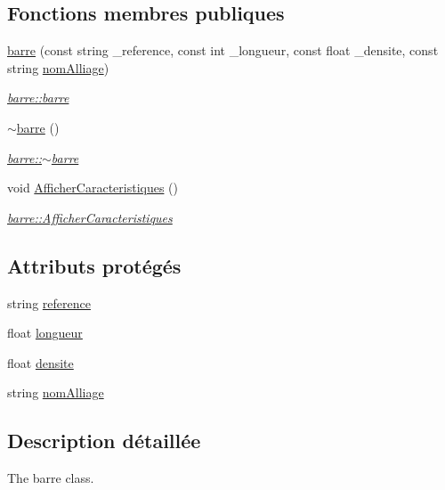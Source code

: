 \subsection*{Fonctions membres publiques}
\begin{DoxyCompactItemize}
\item 
\hyperlink{classbarre_a110cf86db5f686f1fc2dc3472c1d27a5}{barre} (const string \+\_\+reference, const int \+\_\+longueur, const float \+\_\+densite, const string \hyperlink{classbarre_ace8c42f734a0b6046dc7c6ef0e1226f5}{nom\+Alliage})
\begin{DoxyCompactList}\small\item\em \hyperlink{classbarre_a110cf86db5f686f1fc2dc3472c1d27a5}{barre\+::barre} \end{DoxyCompactList}\item 
\hyperlink{classbarre_aad01e01332f1c25ed92b9ea5626a1c33}{$\sim$barre} ()
\begin{DoxyCompactList}\small\item\em \hyperlink{classbarre_aad01e01332f1c25ed92b9ea5626a1c33}{barre\+::$\sim$barre} \end{DoxyCompactList}\item 
void \hyperlink{classbarre_a65fd04c5ba981c50569d582a1b5f35b0}{Afficher\+Caracteristiques} ()
\begin{DoxyCompactList}\small\item\em \hyperlink{classbarre_a65fd04c5ba981c50569d582a1b5f35b0}{barre\+::\+Afficher\+Caracteristiques} \end{DoxyCompactList}\end{DoxyCompactItemize}
\subsection*{Attributs protégés}
\begin{DoxyCompactItemize}
\item 
string \hyperlink{classbarre_a078de0af40f717a1ab145687bda7928d}{reference}
\item 
float \hyperlink{classbarre_acb72acedfbb8c691f29baae6389b8306}{longueur}
\item 
float \hyperlink{classbarre_a41bef49c05b7c407272055ce116f5d9d}{densite}
\item 
string \hyperlink{classbarre_ace8c42f734a0b6046dc7c6ef0e1226f5}{nom\+Alliage}
\end{DoxyCompactItemize}


\subsection{Description détaillée}
The barre class. 

